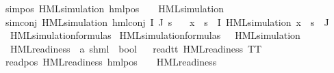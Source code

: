 \begin{isabellebody}
sim{\isacharunderscore}{\kern0pt}pos{\isacharcolon}{\kern0pt}\ {\isachardoublequoteopen}HML{\isacharunderscore}{\kern0pt}simulation\ {\isacharparenleft}{\kern0pt}hml{\isacharunderscore}{\kern0pt}pos\ {\isasymalpha}\ {\isasymphi}{\isacharparenright}{\kern0pt}{\isachardoublequoteclose}\ \ {\isachardoublequoteopen}HML{\isacharunderscore}{\kern0pt}simulation\ {\isasymphi}{\isachardoublequoteclose}{\isacharbar}{\kern0pt}\isanewline
sim{\isacharunderscore}{\kern0pt}conj{\isacharcolon}{\kern0pt}\ {\isachardoublequoteopen}HML{\isacharunderscore}{\kern0pt}simulation\ {\isacharparenleft}{\kern0pt}hml{\isacharunderscore}{\kern0pt}conj\ I\ J\ {\isasympsi}s{\isacharparenright}{\kern0pt}\ {\isachardoublequoteclose}\ \isanewline
{}\ {\isachardoublequoteopen}{\isacharparenleft}{\kern0pt}{\isasymforall}x\ {\isasymin}\ {\isacharparenleft}{\kern0pt}{\isasympsi}s\ {\isacharbackquote}{\kern0pt}\ I{\isacharparenright}{\kern0pt}{\isachardot}{\kern0pt}\ HML{\isacharunderscore}{\kern0pt}simulation\ x{\isacharparenright}{\kern0pt}\ {\isasymand}\ {\isacharparenleft}{\kern0pt}{\isasympsi}s\ {\isacharbackquote}{\kern0pt}\ J\ {\isacharequal}{\kern0pt}\ {\isacharbraceleft}{\kern0pt}{\isacharbraceright}{\kern0pt}{\isacharparenright}{\kern0pt}{\isachardoublequoteclose}\isanewline
\isanewline
{}\isamarkupfalse%
\ HML{\isacharunderscore}{\kern0pt}simulation{\isacharunderscore}{\kern0pt}formulas\ \isanewline
{\isachardoublequoteopen}HML{\isacharunderscore}{\kern0pt}simulation{\isacharunderscore}{\kern0pt}formulas\ {\isasymequiv}\ {\isacharbraceleft}{\kern0pt}{\isasymphi}{\isachardot}{\kern0pt}\ HML{\isacharunderscore}{\kern0pt}simulation\ {\isasymphi}{\isacharbraceright}{\kern0pt}{\isachardoublequoteclose}\isanewline
\isanewline
{}\isamarkupfalse%
\ HML{\isacharunderscore}{\kern0pt}readiness\ {\isacharcolon}{\kern0pt}{\isacharcolon}{\kern0pt}\ {\isachardoublequoteopen}{\isacharparenleft}{\kern0pt}{\isacharprime}{\kern0pt}a{\isacharcomma}{\kern0pt}\ {\isacharprime}{\kern0pt}s{\isacharparenright}{\kern0pt}hml\ {\isasymRightarrow}\ bool{\isachardoublequoteclose}\isanewline
\ \ \isanewline
read{\isacharunderscore}{\kern0pt}tt{\isacharcolon}{\kern0pt}\ {\isachardoublequoteopen}HML{\isacharunderscore}{\kern0pt}readiness\ TT{\isachardoublequoteclose}\ {\isacharbar}{\kern0pt}\isanewline
read{\isacharunderscore}{\kern0pt}pos{\isacharcolon}{\kern0pt}\ {\isachardoublequoteopen}HML{\isacharunderscore}{\kern0pt}readiness\ {\isacharparenleft}{\kern0pt}hml{\isacharunderscore}{\kern0pt}pos\ {\isasymalpha}\ {\isasymphi}{\isacharparenright}{\kern0pt}{\isachardoublequoteclose}\ \ {\isachardoublequoteopen}HML{\isacharunderscore}{\kern0pt}readiness\ {\isasymphi}{\isachardoublequoteclose}{\isacharbar}{\kern0pt}\isanewline

\end{isabellebody}
